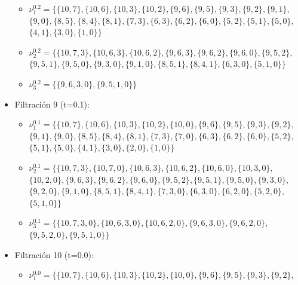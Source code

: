\documentclass[12pt, a4paper, twoside]{book}
\numberwithin{equation}{section}
\theoremstyle{definition}
\newenvironment{ejem}
  {\pushQED{\qed}\renewcommand{\qedsymbol}{$\blacktriangleleft$}\ejemplo}
  {\popQED\endejemplo}
\theoremstyle{remark}
\theoremstyle{plain}
\begin{document}
\begin{ejem}
\begin{itemize}
				\begin{itemize}
					\item {\Large $\nu$}$^{0.2}_{1}=\{\{10, 7\},\{10, 6\},\{10, 3\},\{10, 2\},\{9, 6\},\{9, 5\},\{9, 3\},\{9, 2\},\{9, 1\},$\\
							$\{9, 0\},\{8, 5\},\{8, 4\},\{8, 1\},\{7, 3\},\{6, 3\},\{6, 2\},\{6, 0\},\{5, 2\},\{5, 1\},\{5, 0\},$\\
							$\{4, 1\},\{3, 0\},\{1, 0\}\}$
					\item {\Large $\nu$}$^{0.2}_{2}=\{\{10, 7, 3\},\{10, 6, 3\},\{10, 6, 2\},\{9, 6, 3\},\{9, 6, 2\},\{9, 6, 0\},\{9, 5, 2\},$\\
							$\{9, 5, 1\},\{9, 5, 0\},\{9, 3, 0\},\{9, 1, 0\},\{8, 5, 1\},\{8, 4, 1\},\{6, 3, 0\},\{5, 1, 0\}\}$
					\item {\Large $\nu$}$^{0.2}_{3}=\{\{9, 6, 3, 0\},\{9, 5, 1, 0\}\}$
				\end{itemize}
			\item Filtración 9 (t=0.1):
				\begin{itemize}
					\item {\Large $\nu$}$^{0.1}_{1}=\{\{10, 7\},\{10, 6\},\{10, 3\},\{10, 2\},\{10, 0\},\{9, 6\},\{9, 5\},\{9, 3\},\{9, 2\},$\\
							$\{9, 1\},\{9, 0\},\{8, 5\},\{8, 4\},\{8, 1\},\{7, 3\},\{7, 0\},\{6, 3\},\{6, 2\},\{6, 0\},\{5, 2\},$\\
						$\{5, 1\},\{5, 0\},\{4, 1\},\{3, 0\},\{2, 0\},\{1, 0\}\}$
					\item {\Large $\nu$}$^{0.1}_{2}=\{\{10, 7, 3\},\{10, 7, 0\},\{10, 6, 3\},\{10, 6, 2\},\{10, 6, 0\},\{10, 3, 0\},$\\
							$\{10, 2, 0\},\{9, 6, 3\},\{9, 6, 2\},\{9, 6, 0\},\{9, 5, 2\},\{9, 5, 1\},\{9, 5, 0\},\{9, 3, 0\},$\\
							$\{9, 2, 0\},\{9, 1, 0\},\{8, 5, 1\},\{8, 4, 1\},\{7, 3, 0\},\{6, 3, 0\},\{6, 2, 0\},\{5, 2, 0\},$\\
						$\{5, 1, 0\}\}$
					\item {\Large $\nu$}$^{0.1}_{3}=\{\{10, 7, 3, 0\},\{10, 6, 3, 0\},\{10, 6, 2, 0\},\{9, 6, 3, 0\},\{9, 6, 2, 0\},$\\
						$\{9, 5, 2, 0\},\{9, 5, 1, 0\}\}$
				\end{itemize}
			\item Filtración 10 (t=0.0):
				\begin{itemize}
					\item {\Large $\nu$}$^{0.0}_{1}=\{\{10, 7\},\{10, 6\},\{10, 3\},\{10, 2\},\{10, 0\},\{9, 6\},\{9, 5\},\{9, 3\},\{9, 2\},$\\

\end{itemize}
\end{itemize}
\end{ejem}
\end{document}

